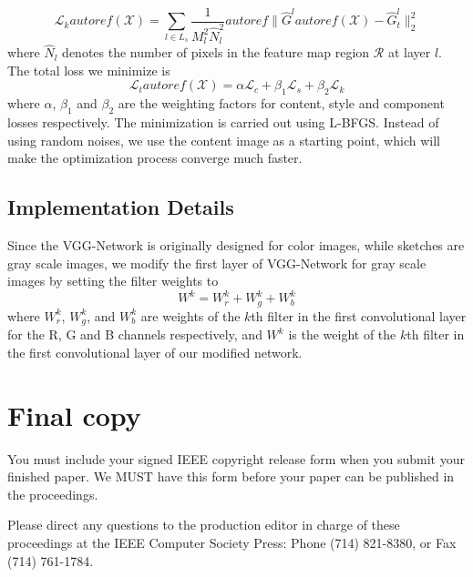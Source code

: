 \documentclass[10pt,twocolumn,letterpaper]{article}
\begin{document}
\begin{equation}
\mathcal{L}_{k} autoref( \mathcal{X} ) = \sum\limits_{l \in {L_s}} {\frac{1}{{M_l^2{\hat N}_l^2}}autoref\| {{{\hat G}^l}autoref( \mathcal{X} ) - {\hat G}_t^l} \|_2^2} 
\label{eq:component_loss}
\end{equation}
where ${\hat N}_l$ denotes the number of pixels in the feature map region $\mathcal R$ at layer $l$. The total loss we minimize is 
\begin{equation}
\mathcal{L}_{t}autoref( \mathcal{X} ) = \alpha \mathcal{L}_{c} + \beta_1 \mathcal{L}_{s} + \beta_2 \mathcal{L}_{k}
\label{eq:Total_loss}
\end{equation}
where $\alpha$, $\beta_1$ and $\beta_2$ are the weighting factors for content, style and component losses respectively. The minimization is carried out using L-BFGS. Instead of using random noises, we use the content image as a starting point, which will make the optimization process converge much faster. 

\subsection{Implementation Details}

Since the VGG-Network is originally designed for color images, while sketches are gray scale images, we modify the first layer of VGG-Network for gray scale images by setting the filter weights to
\begin{equation}
W^{k} = W^{k}_r+W^{k}_g+W^{k}_b
\label{eq:VGG_weights}
\end{equation}
where $W^{k}_r$, $W^{k}_g$, and $W^{k}_b$ are weights of the $k$th filter in the first convolutional layer for the R, G and B channels respectively, and $W^{k}$ is the weight of the $k$th filter in the first convolutional layer of our modified network.

\section{Final copy}

You must include your signed IEEE copyright release form when you submit
your finished paper. We MUST have this form before your paper can be
published in the proceedings.

Please direct any questions to the production editor in charge of these
proceedings at the IEEE Computer Society Press: Phone (714) 821-8380, or
Fax (714) 761-1784.

{\small


}
\end{document}
